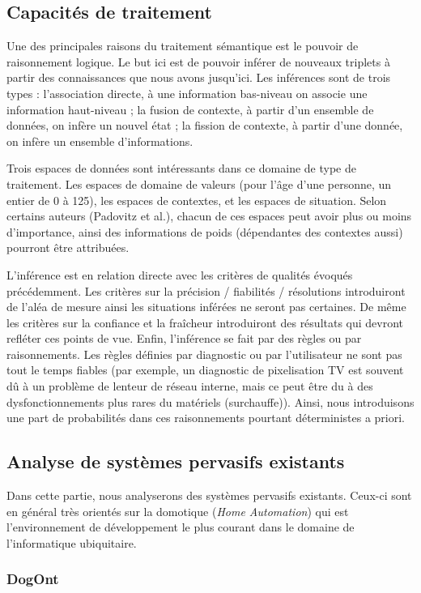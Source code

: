 \subsection{Capacités de traitement}
Une des principales raisons du traitement sémantique est le pouvoir de raisonnement logique. Le but ici est de pouvoir inférer de nouveaux triplets à partir des connaissances que nous avons jusqu'ici. Les inférences sont de trois types : l'association directe, à une information bas-niveau on associe une information haut-niveau ; la fusion de contexte, à partir d'un ensemble de données, on infère un nouvel état ; la fission de contexte, à partir d'une donnée, on infère un ensemble d'informations.

Trois espaces de données sont intéressants dans ce domaine de type de traitement. Les espaces de domaine de valeurs (pour l'âge d'une personne, un entier de 0 à 125), les espaces de contextes, et les espaces de situation. Selon certains auteurs (Padovitz et al.), chacun de ces espaces peut avoir plus ou moins d'importance, ainsi des informations de poids (dépendantes des contextes aussi) pourront être attribuées.

L'inférence est en relation directe avec les critères de qualités évoqués précédemment. Les critères sur la précision / fiabilités / résolutions introduiront de l'aléa de mesure ainsi les situations inférées ne seront pas certaines. De même les critères sur la confiance et la fraîcheur introduiront des résultats qui devront refléter ces points de vue. Enfin, l'inférence se fait par des règles ou par raisonnements. Les règles définies par diagnostic ou par l'utilisateur ne sont pas tout le temps fiables (par exemple, un diagnostic de pixelisation TV est souvent dû à un problème de lenteur de réseau interne, mais ce peut être du à des dysfonctionnements plus rares du matériels (surchauffe)). Ainsi, nous introduisons une part de probabilités dans ces raisonnements pourtant déterministes a priori.

\subsection{Analyse de systèmes pervasifs existants}
Dans cette partie, nous analyserons des systèmes pervasifs existants. Ceux-ci sont en général très orientés sur la domotique (\textit{Home Automation}) qui est l'environnement de développement le plus courant dans le domaine de l'informatique ubiquitaire.

\subsubsection{DogOnt}
